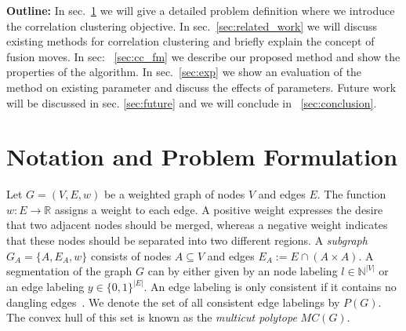 \documentclass[10pt,twocolumn,letterpaper]{article}
\begin{document}

\textbf{Outline:}
In sec.~\ref{sec:problem_formulation} we will give a 
detailed problem definition where we introduce 
the correlation clustering objective.
In sec.~\ref{sec:related_work} we will 
discuss existing methods for correlation 
clustering and briefly explain the concept of fusion moves.
In sec: ~\ref{sec:cc_fm} we describe our proposed
method and show the properties of the algorithm.
In sec.~\ref{sec:exp} we show an evaluation
of the method on existing parameter  and discuss the effects of parameters.
Future work will be discussed in sec. \ref{sec:future} and
we will conclude in ~\ref{sec:conclusion}.

\section{Notation and Problem Formulation}\label{sec:problem_formulation}
Let $G=(V,E, w)$ be a weighted graph of nodes $V$ and edges $E$.
%
The function $w : E \rightarrow \mathbb{R}$ assigns a weight to each edge.
A positive weight expresses the desire that two adjacent nodes should
be merged, whereas a negative weight indicates
that these nodes should be separated into two different regions.
%
A \emph{subgraph} $G_A = \{A, E_A, w\}$ consists
of nodes $A \subseteq V$ and edges $E_A := E\cap (A\times A)$.
%
A segmentation of the graph $G$ can by either given by an 
node labeling $l \in \mathbb{N}^{|V|}$
or an edge labeling $y \in\{0,1\}^{|E|}$.  
An edge labeling is only consistent if it contains no dangling edges~\cite{Kappes-2013-multicut}.
We denote the set of all consistent edge labelings by $P(G)$.
The convex hull of this set is known as the \emph{multicut polytope} $MC(G)$.
\end{document}
